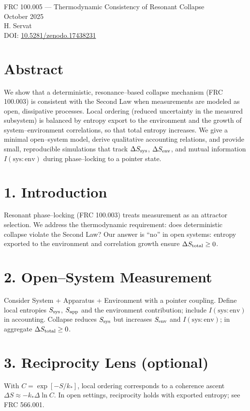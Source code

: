 \documentclass[10pt]{article}
\begin{document}
\begin{center}
{\Large FRC 100.005 — Thermodynamic Consistency of Resonant Collapse}\\
{\large October 2025}\\[4pt]
H. Servat
\\[4pt]
\small DOI: \href{https://doi.org/10.5281/zenodo.17438231}{10.5281/zenodo.17438231}
\end{center}

\section*{Abstract}
We show that a deterministic, resonance--based collapse mechanism (FRC 100.003) is consistent with the Second Law when measurements are modeled as open, dissipative processes. Local ordering (reduced uncertainty in the measured subsystem) is balanced by entropy export to the environment and the growth of system--environment correlations, so that total entropy increases. We give a minimal open--system model, derive qualitative accounting relations, and provide small, reproducible simulations that track $\Delta S_{\rm sys}$, $\Delta S_{\rm env}$, and mutual information $I(\mathrm{sys:env})$ during phase--locking to a pointer state.

\section*{1. Introduction}
Resonant phase--locking (FRC 100.003) treats measurement as an attractor selection. We address the thermodynamic requirement: does deterministic collapse violate the Second Law? Our answer is ``no'' in open systems: entropy exported to the environment and correlation growth ensure $\Delta S_{\rm total}\ge 0$.

\section*{2. Open--System Measurement}
Consider System + Apparatus + Environment with a pointer coupling. Define local entropies $S_{\rm sys}$, $S_{\rm app}$ and the environment contribution; include $I(\mathrm{sys:env})$ in accounting. Collapse reduces $S_{\rm sys}$ but increases $S_{\rm env}$ and $I(\mathrm{sys:env})$; in aggregate $\Delta S_{\rm total}\ge 0$.

\section*{3. Reciprocity Lens (optional)}
With $C=\exp[-S/k_*]$, local ordering corresponds to a coherence ascent $\Delta S\approx -k_*\Delta\ln C$. In open settings, reciprocity holds with exported entropy; see FRC 566.001.
\end{document}
